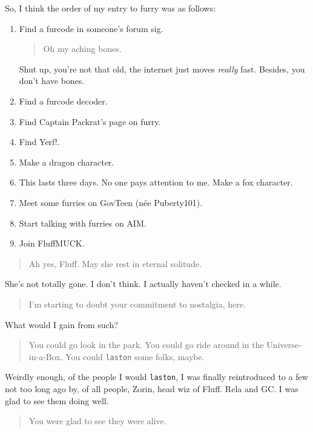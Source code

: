 So, I think the order of my entry to furry was as follows:

\begin{enumerate}
\def\labelenumi{\arabic{enumi}.}
\item
  Find a furcode in someone's forum sig.

  \begin{quote}
  Oh my aching bones.
  \end{quote}

  Shut up, you're not that old, the internet just moves \emph{really} fast. Besides, you don't have bones.
\item
  Find a furcode decoder.
\item
  Find Captain Packrat's page on furry.
\item
  Find Yerf!.
\item
  Make a dragon character.
\item
  This lasts three days. No one pays attention to me. Make a fox character.
\item
  Meet some furries on GovTeen (née Puberty101).
\item
  Start talking with furries on AIM.
\item
  Join FluffMUCK.
\end{enumerate}

\begin{quote}
Ah yes, Fluff. May she rest in eternal solitude.
\end{quote}

She's not totally gone. I don't think. I actually haven't checked in a while.

\begin{quote}
I'm starting to doubt your commitment to nostalgia, here.
\end{quote}

What would I gain from such?

\begin{quote}
You could go look in the park. You could go ride around in the Universe-in-a-Box. You could \texttt{laston} some folks, maybe.
\end{quote}

Weirdly enough, of the people I would \texttt{laston}, I was finally reintroduced to a few not too long ago by, of all people, Zorin, head wiz of Fluff. Rela and GC. I was glad to see them doing well.

\begin{quote}
You were glad to see they were alive.
\end{quote}

